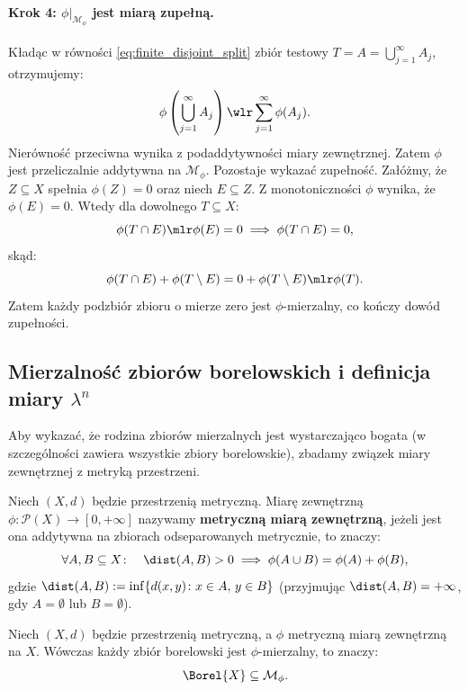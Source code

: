 \begin{dow}
    \paragraph{Krok 4: $\phi|_{\mathcal{M}_\phi}$ jest miarą zupełną.}
    Kładąc w równości \eqref{eq:finite_disjoint_split} zbiór testowy $T = A = \bigcup_{j=1}^\infty A_j$, otrzymujemy:
    \begin{equation*}
        \phi\left(\bigcup_{j=1}^\infty A_j\right) \wlr \sum_{j=1}^\infty \phi(A_j).
    \end{equation*}
    Nierówność przeciwna wynika z podaddytywności miary zewnętrznej. Zatem $\phi$ jest przeliczalnie addytywna na $\mathcal{M}_\phi$. Pozostaje wykazać zupełność. Załóżmy, że $Z \subseteq X$ spełnia $\phi(Z) = 0$ oraz niech $E \subseteq Z$. Z monotoniczności $\phi$ wynika, że $\phi(E) = 0$. Wtedy dla dowolnego $T \subseteq X$:
    \begin{equation*}
        \phi(T \cap E) \mlr \phi(E) = 0 \implies \phi(T \cap E) = 0,
    \end{equation*} skąd:
    \begin{equation*}
        \phi(T \cap E) + \phi(T \setminus E) = 0 + \phi(T \setminus E) \mlr \phi(T).
    \end{equation*}
    Zatem każdy podzbiór zbioru o mierze zero jest $\phi$-mierzalny, co kończy dowód zupełności.
\end{dow}
\subsection{Mierzalność zbiorów borelowskich i definicja miary $\lambda^n$}
Aby wykazać, że rodzina zbiorów mierzalnych jest wystarczająco bogata (w szczególności zawiera wszystkie zbiory borelowskie), zbadamy związek miary zewnętrznej z metryką przestrzeni.
\begin{defi}
    Niech $(X, d)$ będzie przestrzenią metryczną. Miarę zewnętrzną $\phi \colon \mathcal{P}(X) \to [0, +\infty]$ nazywamy \textbf{metryczną miarą zewnętrzną}, jeżeli jest ona addytywna na zbiorach odseparowanych metrycznie, to znaczy:
    \begin{equation*}
        \forall A, B \subseteq X \colon \quad \dist(A, B) > 0 \implies \phi(A \cup B) = \phi(A) + \phi(B),
    \end{equation*}
    gdzie $\dist(A, B) := \inf\{d(x, y) \colon x \in A, \, y \in B\}$ (przyjmując $\dist(A, B) = +\infty$, gdy $A = \emptyset$ lub $B = \emptyset$).
\end{defi}
\begin{tw}\label{tw:metric_borel}
    Niech $(X, d)$ będzie przestrzenią metryczną, a $\phi$ metryczną miarą zewnętrzną na $X$. Wówczas każdy zbiór borelowski jest $\phi$-mierzalny, to znaczy:
    \begin{equation*}
        \Borel{X} \subseteq \mathcal{M}_\phi.
    \end{equation*}
\end{tw}

